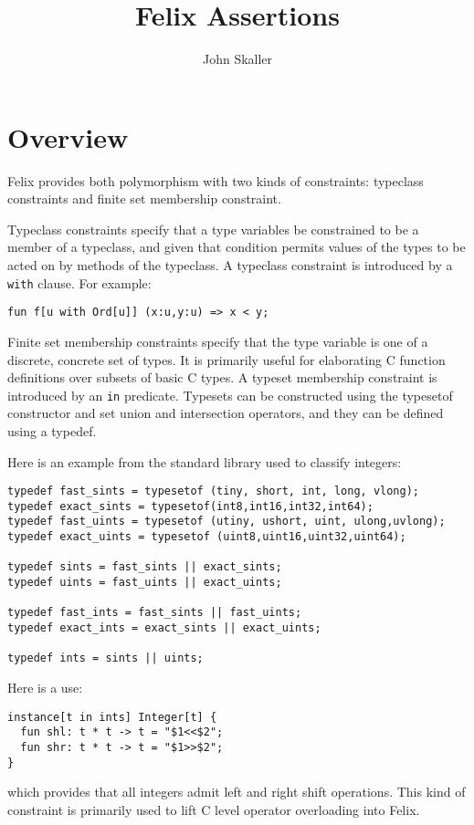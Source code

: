 \documentclass{report}
\title{Felix Assertions}
\author{John Skaller}
\begin{document}
\maketitle
\tableofcontents

\chapter{Overview}
Felix provides both polymorphism with two kinds of constraints: typeclass constraints
and finite set membership constraint.

Typeclass constraints specify that a type variables be constrained to be a member
of a typeclass, and given that condition permits values of the types 
to be acted on by methods of the typeclass. A typeclass constraint is
introduced by a {\tt with} clause. For example:
\begin{verbatim}
fun f[u with Ord[u]] (x:u,y:u) => x < y;
\end{verbatim}

Finite set membership constraints specify that the type variable is 
one of a discrete, concrete set of types. It is primarily useful
for elaborating C function definitions over subsets of basic C types.
A typeset membership constraint is introduced by an {\tt in} predicate.
Typesets can be constructed using the typesetof constructor and
set union and intersection operators, and they can be defined 
using a typedef.

Here is an example from the standard library used to
classify integers:

\begin{verbatim}
typedef fast_sints = typesetof (tiny, short, int, long, vlong);
typedef exact_sints = typesetof(int8,int16,int32,int64);
typedef fast_uints = typesetof (utiny, ushort, uint, ulong,uvlong);
typedef exact_uints = typesetof (uint8,uint16,uint32,uint64);

typedef sints = fast_sints || exact_sints;
typedef uints = fast_uints || exact_uints;

typedef fast_ints = fast_sints || fast_uints;
typedef exact_ints = exact_sints || exact_uints;

typedef ints = sints || uints;
\end{verbatim}

Here is a use:
\begin{verbatim}
instance[t in ints] Integer[t] {
  fun shl: t * t -> t = "$1<<$2";
  fun shr: t * t -> t = "$1>>$2";
}
\end{verbatim}
which provides that all integers admit left
and right shift operations. This kind of constraint
is primarily used to lift C level operator overloading
into Felix.
\end{document}
